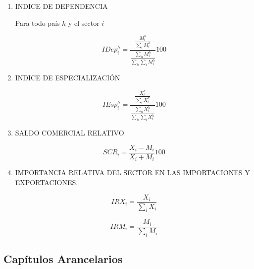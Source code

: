 \documentclass[a4paper,openright,12pt]{book}
\begin{document}
\begin{enumerate}

    \item INDICE DE DEPENDENCIA

    Para todo país $h$ y el sector $i$

    \begin{equation}
    IDep^h_i = \frac{\frac{M^h_i}{\sum_i M^h_i}}{\frac{\sum_h M^h_i}{\sum_h \sum_i M^h_i}} 100
    \end{equation}

    \item INDICE DE ESPECIALIZACIÓN

    \begin{equation}
    IEsp^h_i = \frac{\frac{X^h_i}{\sum_i X^h_i}}{\frac{\sum_h X^h_i}{\sum_h \sum_i X^h_i}} 100
    \end{equation}

    \item SALDO COMERCIAL RELATIVO

    \begin{equation}
    SCR_i = \frac{X_i - M_i}{X_i + M_i} 100
    \end{equation}

    \item IMPORTANCIA RELATIVA DEL SECTOR EN LAS IMPORTACIONES Y EXPORTACIONES.

    \begin{equation}
    IRX_i = \frac{X_i}{\sum_i X_i}
    \end{equation}

    \begin{equation}
    IRM_i = \frac{M_i}{\sum_i M_i}
    \end{equation}

\end{enumerate}

\subsection{Capítulos Arancelarios}
\end{document}
